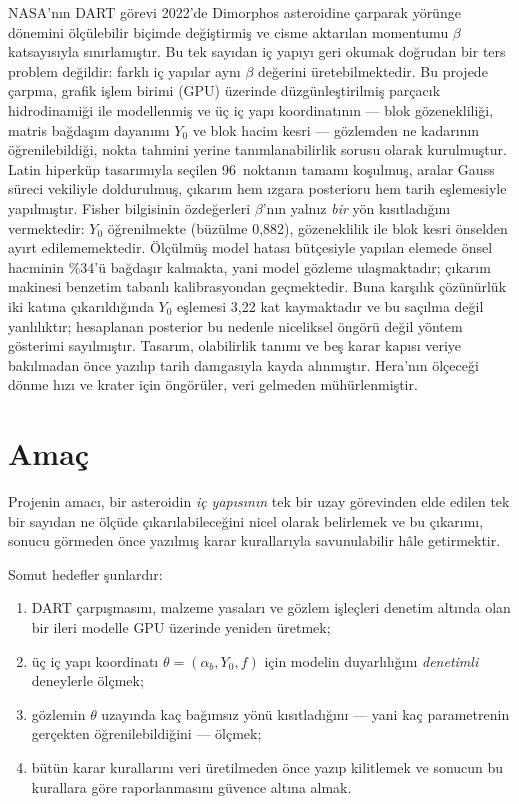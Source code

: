 \documentclass[12pt,a4paper]{article}
\newcommand{\havuzToplam}{96}
\begin{document}
NASA'nın DART görevi 2022'de Dimorphos asteroidine çarparak yörünge
dönemini ölçülebilir biçimde değiştirmiş ve cisme aktarılan momentumu
$\beta$ katsayısıyla sınırlamıştır. Bu tek sayıdan iç yapıyı geri okumak
doğrudan bir ters problem değildir: farklı iç yapılar aynı $\beta$
değerini üretebilmektedir. Bu projede çarpma, grafik işlem birimi (GPU)
üzerinde düzgünleştirilmiş parçacık hidrodinamiği ile modellenmiş ve üç
iç yapı koordinatının --- blok gözenekliliği, matris bağdaşım dayanımı
$Y_0$ ve blok hacim kesri --- gözlemden ne kadarının öğrenilebildiği,
nokta tahmini yerine tanımlanabilirlik sorusu olarak kurulmuştur. Latin
hiperküp tasarımıyla seçilen \havuzToplam\ noktanın tamamı koşulmuş,
aralar Gauss süreci vekiliyle doldurulmuş, çıkarım hem ızgara posterioru
hem tarih eşlemesiyle yapılmıştır. Fisher bilgisinin özdeğerleri
$\beta$'nın yalnız \emph{bir} yön kısıtladığını vermektedir: $Y_0$
öğrenilmekte (büzülme 0,882), gözeneklilik ile blok kesri önselden ayırt
edilememektedir. Ölçülmüş model hatası bütçesiyle yapılan elemede önsel
hacminin \%34'ü bağdaşır kalmakta, yani model gözleme ulaşmaktadır;
çıkarım makinesi benzetim tabanlı kalibrasyondan geçmektedir. Buna
karşılık çözünürlük iki katına çıkarıldığında $Y_0$ eşlemesi 3,22 kat
kaymaktadır ve bu saçılma değil yanlılıktır; hesaplanan posterior bu
nedenle niceliksel öngörü değil yöntem gösterimi sayılmıştır. Tasarım,
olabilirlik tanımı ve beş karar kapısı veriye bakılmadan önce yazılıp
tarih damgasıyla kayda alınmıştır. Hera'nın ölçeceği dönme hızı ve krater
için öngörüler, veri gelmeden mühürlenmiştir.


\section{Amaç}

Projenin amacı, bir asteroidin \emph{iç yapısının} tek bir uzay
görevinden elde edilen tek bir sayıdan ne ölçüde çıkarılabileceğini
nicel olarak belirlemek ve bu çıkarımı, sonucu görmeden önce yazılmış
karar kurallarıyla savunulabilir hâle getirmektir.

Somut hedefler şunlardır:

\begin{enumerate}[leftmargin=9mm,itemsep=1pt,topsep=2pt]
\item DART çarpışmasını, malzeme yasaları ve gözlem işleçleri denetim
      altında olan bir ileri modelle GPU üzerinde yeniden üretmek;
\item üç iç yapı koordinatı $\theta=(\alpha_b, Y_0, f)$ için modelin
      duyarlılığını \emph{denetimli} deneylerle ölçmek;
\item gözlemin $\theta$ uzayında kaç bağımsız yönü kısıtladığını ---
      yani kaç parametrenin gerçekten öğrenilebildiğini --- ölçmek;
\item bütün karar kurallarını veri üretilmeden önce yazıp kilitlemek ve
      sonucun bu kurallara göre raporlanmasını güvence altına almak.
\end{enumerate}
\end{document}
